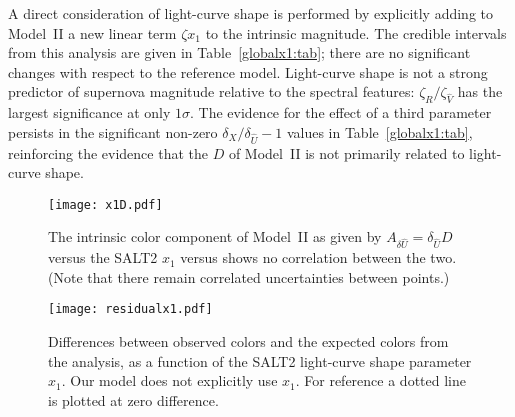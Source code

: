 \documentclass{aastex61}   	%
\begin{document}
A direct consideration of light-curve shape is
performed by explicitly adding to Model~II a new linear term $\zeta x_1$ to the 
intrinsic magnitude. The credible intervals
from this analysis are given in Table~\ref{globalx1:tab}; there are no significant changes with respect to the reference model. 
Light-curve shape is not a strong predictor of supernova magnitude relative to the spectral features: $\zeta_{\hat{R}}/\zeta_{\hat{V}}$
has the largest significance  at 
only
$1\sigma$.
The evidence for the effect of a third parameter persists in the significant  non-zero  $\delta_X/\delta_{\hat{U}}-1$ values
in Table~\ref{globalx1:tab}, reinforcing the evidence that the $D$ of Model~II is not primarily related to light-curve shape.

\begin{figure}[htbp] %
   \centering
   \texttt{[image: x1D.pdf]}
    \caption{The
    intrinsic color component of Model~II as given by
    $A_{\delta {\hat{U}}}  = \delta_{\hat{U}} D$
    versus
    the SALT2 $x_1$ versus
    shows no correlation between the two.  (Note that there remain correlated uncertainties between points.)
   \label{x1:fig}}
\end{figure}


\begin{figure}[htbp] %
   \centering
   \texttt{[image: residualx1.pdf]}
    \caption{Differences between observed colors and the     \color{red}
    expected \color{black} colors
     from the analysis, as a function
            of the SALT2 light-curve shape parameter $x_1$.  Our model does not explicitly use $x_1$.  For reference a dotted line is plotted at zero difference.
   \label{x1res:fig}}
\end{figure}
\end{document}
